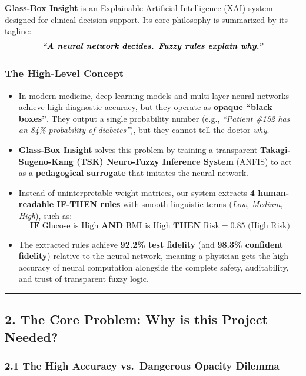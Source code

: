 \textbf{Glass-Box Insight} is an Explainable Artificial Intelligence
(XAI) system designed for clinical decision support. Its core philosophy
is summarized by its tagline:
\[\textbf{\textit{``A neural network decides. Fuzzy rules explain why.''}}\]

\subsubsection{The High-Level Concept}\label{the-high-level-concept}

\begin{itemize}
\tightlist
\item
  In modern medicine, deep learning models and multi-layer neural
  networks achieve high diagnostic accuracy, but they operate as
  \textbf{opaque ``black boxes''}. They output a single probability
  number (e.g., \emph{``Patient \#152 has an 84\% probability of
  diabetes''}), but they cannot tell the doctor \emph{why}.
\item
  \textbf{Glass-Box Insight} solves this problem by training a
  transparent \textbf{Takagi-Sugeno-Kang (TSK) Neuro-Fuzzy Inference
  System} (ANFIS) to act as a \textbf{pedagogical surrogate} that
  imitates the neural network.
\item
  Instead of uninterpretable weight matrices, our system extracts
  \textbf{4 human-readable IF-THEN rules} with smooth linguistic terms
  (\emph{Low}, \emph{Medium}, \emph{High}), such as:
  \[\textbf{IF } \text{Glucose is High } \textbf{AND } \text{BMI is High } \textbf{THEN } \text{Risk} = 0.85 \text{ (High Risk)}\]
\item
  The extracted rules achieve \textbf{92.2\% test fidelity} (and
  \textbf{98.3\% confident fidelity}) relative to the neural network,
  meaning a physician gets the high accuracy of neural computation
  alongside the complete safety, auditability, and trust of transparent
  fuzzy logic.
\end{itemize}

\begin{center}\rule{0.5\linewidth}{0.5pt}\end{center}

\subsection{2. The Core Problem: Why is this Project
Needed?}\label{the-core-problem-why-is-this-project-needed}

\subsubsection{2.1 The High Accuracy vs.~Dangerous Opacity
Dilemma}\label{the-high-accuracy-vs.-dangerous-opacity-dilemma}

